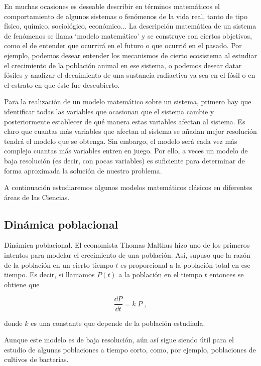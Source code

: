 En muchas ocasiones es deseable describir en términos matemáticos el comportamiento de algunos sistemas o fenómenos de la vida real, tanto de tipo físico, químico, sociológico, económico... La descripción matemática de un sistema de fenómenos se llama `modelo matemático' y se construye con ciertos objetivos, como el de entender que ocurrirá en el futuro o que ocurrió en el pasado. Por ejemplo, podemos desear entender los mecanismos de cierto ecosistema al estudiar el crecimiento de la población animal en ese sistema, o podemos desear datar fósiles y analizar el decaimiento de una sustancia radiactiva ya sea en el fósil o en el estrato en que éste fue descubierto. 

Para la realización de un modelo matemático sobre un sistema, primero hay que identificar todas las variables que ocasionan que el sistema cambie y posteriormente establecer de qué manera estas variables afectan al sistema. Es claro que cuantas más variables que afectan al sistema se añadan mejor resolución tendrá el modelo que se obtenga. Sin embargo, el modelo será cada vez más complejo cuantas más variables entren en juego. Por ello, a veces un modelo de baja resolución (es decir, con pocas variables) es suficiente para determinar de forma aproximada la solución de nuestro problema. 

A continuación estudiaremos algunos modelos matemáticos clásicos en diferentes áreas de las Ciencias.

\subsection{Dinámica poblacional}

Dinámica poblacional. 
El economista Thomas Malthus hizo uno de los primeros intentos para modelar el crecimiento de una población. Así, supuso que la razón de la población en un cierto tiempo $t$ es proporcional a la población total en ese tiempo. Es decir, si llamamos $P(t)$ a la población en el tiempo $t$ entonces se obtiene que 

\begin{equation*}
	\dfrac {\dd P}{\dd t}=k\; P\; ,
\end{equation*}

donde $k$ es una constante que depende de la población estudiada.

Aunque este modelo es de baja resolución, aún así sigue siendo útil para el estudio de algunas poblaciones a tiempo corto, como, por ejemplo, poblaciones de cultivos de bacterias. 


